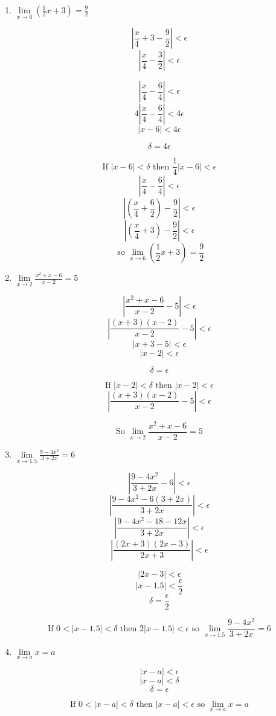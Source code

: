 \documentclass{article}
\begin{document}
\begin{enumerate}
		\item $\lim \limits _{x \to 6} (\frac{1}{2}x + 3) = \frac{9}{2}$
		
			$$|\frac{x}{4} + 3 - \frac{9}{2}| < \epsilon$$
			$$|\frac{x}{4} - \frac{3}{2}| < \epsilon$$
			
			$$|\frac{x}{4} - \frac{6}{4}| < \epsilon$$
			$$4|\frac{x}{4} - \frac{6}{4}| < 4\epsilon$$
			$$|x - 6| < 4\epsilon$$
			
			$$\delta = 4\epsilon$$
			
			$$\text{If } | x - 6 | < \delta \text{ then } \frac{1}{4}| x - 6| < \epsilon$$
			$$|\frac{x}{4} - \frac{6}{4} | < \epsilon$$
			$$|(\frac{x}{4} + \frac{6}{2}) - \frac{9}{2} | < \epsilon$$
			$$|( \frac{x}{4} + 3) - \frac{9}{2} | < \epsilon$$
			$$\text{ so } \lim \limits _{x \to 6} (\frac{1}{2}x + 3) = \frac{9}{2}$$
			
		\item $\lim \limits _{x \to 2} \frac{x^2 + x - 6}{x - 2} = 5$
		
			$$|\frac{x ^2 + x - 6}{x - 2} - 5| < \epsilon$$
			$$|\frac{(x+3)(x-2)}{x-2} - 5| < \epsilon$$
			$$|x + 3 - 5| < \epsilon$$
			$$|x - 2| < \epsilon$$
			
			$$\delta = \epsilon$$
			
			$$\text{If } |x - 2| < \delta \text{ then } | x - 2 | < \epsilon$$
			$$|\frac{(x+3)(x-2)}{x-2} - 5| < \epsilon$$
			
			$$\text{So } \lim \limits _{x \to 2} \frac{x^2 + x - 6}{x - 2} = 5$$
			
		\item $\lim \limits _{x \to 1.5} \frac{9 - 4x^2}{3 + 2x} = 6$
		
			$$|\frac{9 - 4x^2}{3 + 2x} - 6| < \epsilon$$
			$$|\frac{9 - 4x^2 - 6(3 + 2x)}{3 + 2x}| < \epsilon$$
			$$|\frac{9 - 4x^2 - 18 - 12x}{3 + 2x}| < \epsilon$$
			$$|\frac{(2x + 3)(2x - 3)}{2x + 3}| < \epsilon$$
			
			$$|2x - 3| < \epsilon$$
			$$|x - 1.5| < \frac{\epsilon}{2}$$
			$$ \delta = \frac{\epsilon}{2}$$
			
			$$\text{If } 0 < | x - 1.5| < \delta \text{ then } 2| x - 1.5| < \epsilon 
			\text{ so } \lim \limits _{x \to 1.5} \frac{9 - 4x^2}{3 + 2x} = 6$$
			
		\item $\lim \limits _ { x \to a} x = a$
		
			$$| x - a | < \epsilon$$
			$$| x - a | < \delta$$
			$$ \delta = \epsilon$$
			
			$$\text{If } 0 < | x - a| < \delta \text{ then } |x - a| < \epsilon \text{ so } \lim \limits _ { x \to a} x = a$$
			

\end{enumerate}
\end{document}
